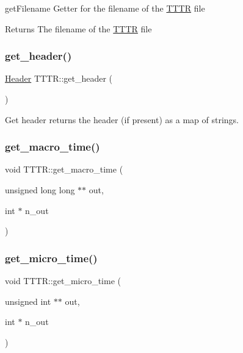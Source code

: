 get\+Filename Getter for the filename of the \hyperlink{class_t_t_t_r}{T\+T\+TR} file

\begin{DoxyReturn}{Returns}
The filename of the \hyperlink{class_t_t_t_r}{T\+T\+TR} file 
\end{DoxyReturn}
\mbox{\label{class_t_t_t_r_a7953fb4f0b1d7ada40d6ff19cec45672}} 
\subsubsection{\texorpdfstring{get\+\_\+header()}{get\_header()}}
{\footnotesize\ttfamily \hyperlink{class_header}{Header} T\+T\+T\+R\+::get\+\_\+header (\begin{DoxyParamCaption}{ }\end{DoxyParamCaption})}



Get header returns the header (if present) as a map of strings. 

\mbox{\label{class_t_t_t_r_abe71172a7c0339f09e336a0dcfb48e94}} 
\subsubsection{\texorpdfstring{get\+\_\+macro\+\_\+time()}{get\_macro\_time()}}
{\footnotesize\ttfamily void T\+T\+T\+R\+::get\+\_\+macro\+\_\+time (\begin{DoxyParamCaption}\item[{unsigned long long $\ast$$\ast$}]{out,  }\item[{int $\ast$}]{n\+\_\+out }\end{DoxyParamCaption})}

\mbox{\label{class_t_t_t_r_af68c9a5a7c3ec01a5097864b4d97975a}} 
\subsubsection{\texorpdfstring{get\+\_\+micro\+\_\+time()}{get\_micro\_time()}}
{\footnotesize\ttfamily void T\+T\+T\+R\+::get\+\_\+micro\+\_\+time (\begin{DoxyParamCaption}\item[{unsigned int $\ast$$\ast$}]{out,  }\item[{int $\ast$}]{n\+\_\+out }\end{DoxyParamCaption})}

